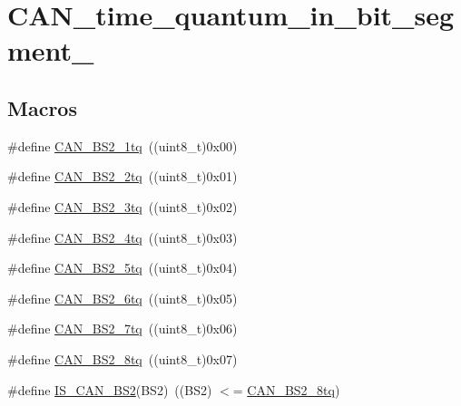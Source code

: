 \hypertarget{group___c_a_n__time__quantum__in__bit__segment__2}{}\section{C\+A\+N\+\_\+time\+\_\+quantum\+\_\+in\+\_\+bit\+\_\+segment\+\_}
\label{group___c_a_n__time__quantum__in__bit__segment__2}
\subsection*{Macros}
\begin{DoxyCompactItemize}
\item 
\#define \mbox{\hyperlink{group___c_a_n__time__quantum__in__bit__segment__2_gad9af25a3f61df7b09b8d6a5e81d8027e}{C\+A\+N\+\_\+\+B\+S2\+\_\+1tq}}~((uint8\+\_\+t)0x00)
\item 
\#define \mbox{\hyperlink{group___c_a_n__time__quantum__in__bit__segment__2_gac43d82f74990620499f1998187ff3602}{C\+A\+N\+\_\+\+B\+S2\+\_\+2tq}}~((uint8\+\_\+t)0x01)
\item 
\#define \mbox{\hyperlink{group___c_a_n__time__quantum__in__bit__segment__2_gab3d325ce4a5d0eb1ee8ee50ad4ec7e49}{C\+A\+N\+\_\+\+B\+S2\+\_\+3tq}}~((uint8\+\_\+t)0x02)
\item 
\#define \mbox{\hyperlink{group___c_a_n__time__quantum__in__bit__segment__2_gaaff1c1cdd809f185299971c6437f32a0}{C\+A\+N\+\_\+\+B\+S2\+\_\+4tq}}~((uint8\+\_\+t)0x03)
\item 
\#define \mbox{\hyperlink{group___c_a_n__time__quantum__in__bit__segment__2_ga89feba32bcc2e909f858d535edaad101}{C\+A\+N\+\_\+\+B\+S2\+\_\+5tq}}~((uint8\+\_\+t)0x04)
\item 
\#define \mbox{\hyperlink{group___c_a_n__time__quantum__in__bit__segment__2_ga72c3245b794d3238763d1ec319bf386f}{C\+A\+N\+\_\+\+B\+S2\+\_\+6tq}}~((uint8\+\_\+t)0x05)
\item 
\#define \mbox{\hyperlink{group___c_a_n__time__quantum__in__bit__segment__2_ga8005adaef02fb90e400909de08dec031}{C\+A\+N\+\_\+\+B\+S2\+\_\+7tq}}~((uint8\+\_\+t)0x06)
\item 
\#define \mbox{\hyperlink{group___c_a_n__time__quantum__in__bit__segment__2_gaad8dcbb266cf5074bfb67bd7108597c6}{C\+A\+N\+\_\+\+B\+S2\+\_\+8tq}}~((uint8\+\_\+t)0x07)
\item 
\#define \mbox{\hyperlink{group___c_a_n__time__quantum__in__bit__segment__2_ga3f5620b1d094dbd7d2fb8d16f4b187a9}{I\+S\+\_\+\+C\+A\+N\+\_\+\+B\+S2}}(B\+S2)~((B\+S2) $<$= \mbox{\hyperlink{group___c_a_n__time__quantum__in__bit__segment__2_gaad8dcbb266cf5074bfb67bd7108597c6}{C\+A\+N\+\_\+\+B\+S2\+\_\+8tq}})
\end{DoxyCompactItemize}


